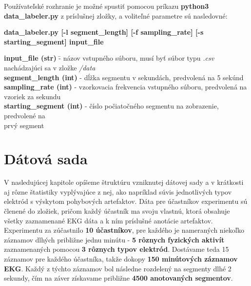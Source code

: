 Používateľské rozhranie je možné spustiť pomocou príkazu \textbf{python3 data\_labeler.py} z príslušnej zložky, a voliteľné parametre sú nasledovné:

 \noindent \textbf{data\_labeler.py [-l segment\_length] [-f sampling\_rate] [-s starting\_segment] input\_file}
 
\begin{tabbing}
    \indent \textbf{input\_file (str)} \quad\quad\quad\quad \= - názov vstupného súboru, musí byť súbor typu \textit{.csv}\\
                                                            \> nachádzajúci sa v zložke \textit{/data}\\
    \indent \textbf{segment\_length (int)}                  \> - dĺžka segmentu v sekundách, predvolená na 5 sekúnd\\
    \indent \textbf{sampling\_rate (int)}                   \> - vzorkovacia frekvencia vstupného súboru, predvolená na\\
                                                             vzoriek za sekundu\\
    \indent \textbf{starting\_segment (int)}                \> - číslo počiatočného segmentu na zobrazenie, predvolené na\\
                                                            \> prvý segment\\
\end{tabbing}



\chapter{Dátová sada}

V nasledujúcej kapitole opíšeme štruktúru vzniknutej dátovej sady a v krátkosti aj rôzne štatistiky vyplývajúce z nej, ako napríklad súvis jednotlivých typov elektród s výskytom pohybových artefaktov. Dáta pre účastníkov experimentu sú členené do zložiek, pričom každý účastník ma svoju vlastnú, ktorá obsahuje všetky zaznamenané EKG dáta a k ním príslušné anotácie artefaktov. Experimentu za zúčastnilo \textbf{10 účastníkov}, pre každého je nameraných niekoľko záznamov dlhých približne jednu minútu - \textbf{5 rôznych fyzických aktivít} zaznamenaných pomocou \textbf{3 rôznych typov elektród}. Dostávame teda 15 záznamov pre každého účastníka, takže dokopy \textbf{150 minútových záznamov EKG}. Každý z týchto záznamov bol následne rozdelený na segmenty dlhé 2 sekundy, čím na záver získavame približne \textbf{4500 anotovaných segmentov}.

